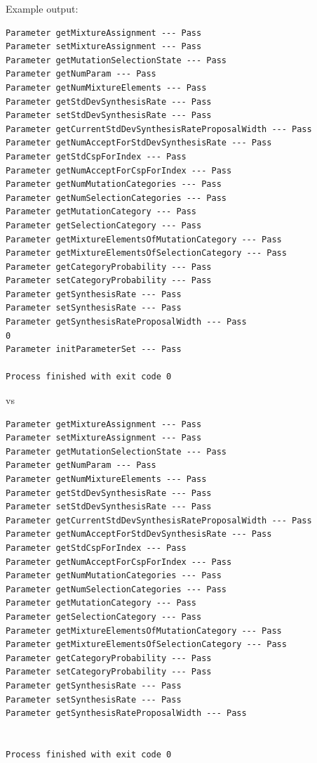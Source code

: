 \documentclass[12pt,hyperref]{labbook}
\begin{document}
Example output:

\noindent\begin{minipage}{\linewidth}
\begin{lstlisting}
Parameter getMixtureAssignment --- Pass
Parameter setMixtureAssignment --- Pass
Parameter getMutationSelectionState --- Pass
Parameter getNumParam --- Pass
Parameter getNumMixtureElements --- Pass
Parameter getStdDevSynthesisRate --- Pass
Parameter setStdDevSynthesisRate --- Pass
Parameter getCurrentStdDevSynthesisRateProposalWidth --- Pass
Parameter getNumAcceptForStdDevSynthesisRate --- Pass
Parameter getStdCspForIndex --- Pass
Parameter getNumAcceptForCspForIndex --- Pass
Parameter getNumMutationCategories --- Pass
Parameter getNumSelectionCategories --- Pass
Parameter getMutationCategory --- Pass
Parameter getSelectionCategory --- Pass
Parameter getMixtureElementsOfMutationCategory --- Pass
Parameter getMixtureElementsOfSelectionCategory --- Pass
Parameter getCategoryProbability --- Pass
Parameter setCategoryProbability --- Pass
Parameter getSynthesisRate --- Pass
Parameter setSynthesisRate --- Pass
Parameter getSynthesisRateProposalWidth --- Pass
0
Parameter initParameterSet --- Pass

Process finished with exit code 0
\end{lstlisting}
\end{minipage}

vs

\noindent\begin{minipage}{\linewidth}
\begin{lstlisting}
Parameter getMixtureAssignment --- Pass
Parameter setMixtureAssignment --- Pass
Parameter getMutationSelectionState --- Pass
Parameter getNumParam --- Pass
Parameter getNumMixtureElements --- Pass
Parameter getStdDevSynthesisRate --- Pass
Parameter setStdDevSynthesisRate --- Pass
Parameter getCurrentStdDevSynthesisRateProposalWidth --- Pass
Parameter getNumAcceptForStdDevSynthesisRate --- Pass
Parameter getStdCspForIndex --- Pass
Parameter getNumAcceptForCspForIndex --- Pass
Parameter getNumMutationCategories --- Pass
Parameter getNumSelectionCategories --- Pass
Parameter getMutationCategory --- Pass
Parameter getSelectionCategory --- Pass
Parameter getMixtureElementsOfMutationCategory --- Pass
Parameter getMixtureElementsOfSelectionCategory --- Pass
Parameter getCategoryProbability --- Pass
Parameter setCategoryProbability --- Pass
Parameter getSynthesisRate --- Pass
Parameter setSynthesisRate --- Pass
Parameter getSynthesisRateProposalWidth --- Pass


Process finished with exit code 0
\end{lstlisting}
\end{minipage}
\end{document}
